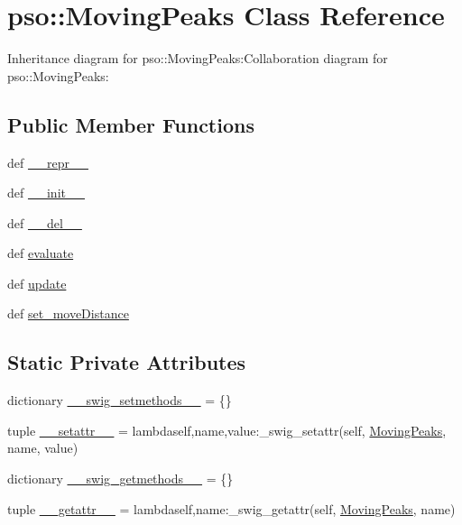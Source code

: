 \hypertarget{classpso_1_1MovingPeaks}{
\section{pso::MovingPeaks Class Reference}
\label{classpso_1_1MovingPeaks}
}
Inheritance diagram for pso::MovingPeaks:Collaboration diagram for pso::MovingPeaks:\subsection*{Public Member Functions}
\begin{CompactItemize}
\item 
def \hyperlink{classpso_1_1MovingPeaks_a49761a17dfa13ee9bd3854cae9b6db7}{\_\-\_\-repr\_\-\_\-}
\item 
def \hyperlink{classpso_1_1MovingPeaks_f48b3a4fe44b6a14626ea7c9dfaccd66}{\_\-\_\-init\_\-\_\-}
\item 
def \hyperlink{classpso_1_1MovingPeaks_51bfd4ae5fc9d7b2f6ed4ebcc8f3470b}{\_\-\_\-del\_\-\_\-}
\item 
def \hyperlink{classpso_1_1MovingPeaks_bac0595181eff4c3e7b1975e58c7af22}{evaluate}
\item 
def \hyperlink{classpso_1_1MovingPeaks_2498bfb3e35cc34ed63f1fcf6c8dbdd6}{update}
\item 
def \hyperlink{classpso_1_1MovingPeaks_5ade0db216cabe9a9eb062e7dcc59ec2}{set\_\-moveDistance}
\end{CompactItemize}
\subsection*{Static Private Attributes}
\begin{CompactItemize}
\item 
dictionary \hyperlink{classpso_1_1MovingPeaks_635671a6ae57a2c5d14d2ab1627f2f2c}{\_\-\_\-swig\_\-setmethods\_\-\_\-} = \{\}
\item 
tuple \hyperlink{classpso_1_1MovingPeaks_a30c9de8ca26c42218b1c3a211f7d0cf}{\_\-\_\-setattr\_\-\_\-} = lambdaself,name,value:\_\-swig\_\-setattr(self, \hyperlink{classpso_1_1MovingPeaks}{MovingPeaks}, name, value)
\item 
dictionary \hyperlink{classpso_1_1MovingPeaks_5272ada93241271df664fb5ecdc73f0a}{\_\-\_\-swig\_\-getmethods\_\-\_\-} = \{\}
\item 
tuple \hyperlink{classpso_1_1MovingPeaks_08590ac9c017e29081714cd95383a679}{\_\-\_\-getattr\_\-\_\-} = lambdaself,name:\_\-swig\_\-getattr(self, \hyperlink{classpso_1_1MovingPeaks}{MovingPeaks}, name)
\end{CompactItemize}


